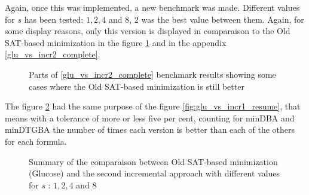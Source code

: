Again, once this was implemented, a new benchmark was made. Different values for $s$ has been tested:
$1, 2, 4$ and $8$, $2$ was the best value between them. Again, for some display reasons, only this version
is displayed in comparaison to the Old SAT-based minimization in the figure \ref{fig:glu_vs_incr2_short}
and in the appendix \ref{glu_vs_incr2_complete}.

\begin{figure}[H]
 \centering
 \fontsize{9}{11}
 \caption{Parts of \ref{glu_vs_incr2_complete} benchmark results showing some cases where the Old SAT-based
          minimization is still better}
 \label{fig:glu_vs_incr2_short}
\end{figure}

The figure \ref{fig:glu_vs_incr2_resume} had the same purpose of the figure
\ref{fig:glu_vs_incr1_resume}, that means with a tolerance of more or less five per cent, counting
for minDBA and minDTGBA the number of times each version is better than each of the others for
each formula.\\

\begin{figure}[H]
 \centering
 
 \caption{Summary of the comparaison between Old SAT-based minimization (Glucose) and the second incremental
          approach with different values for $s$ : $1, 2, 4$ and $8$}
 \label{fig:glu_vs_incr2_resume}
\end{figure}

